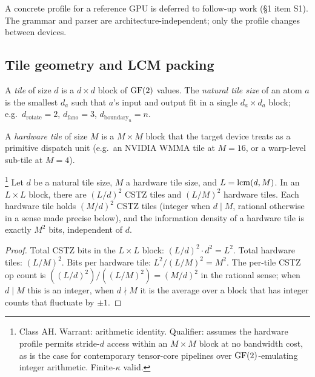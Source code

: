 A concrete profile for a reference GPU is deferred to
follow-up work (\S1 item S1). The grammar and parser
are architecture-independent; only the profile changes
between devices.

\subsection{Tile geometry and LCM packing}

\begin{definition}[Tile]\label{def:tile}
  A \emph{tile} of size $d$ is a $d \times d$ block of
  $\operatorname{GF}(2)$ values. The \emph{natural tile size} of an
  atom $a$ is the smallest $d_a$ such that $a$'s input
  and output fit in a single $d_a \times d_a$ block;
  e.g.\ $d_{\mathrm{rotate}} = 2$,
  $d_{\mathrm{fano}} = 3$,
  $d_{\mathrm{boundary}_n} = n$.
\end{definition}

\begin{definition}\label{def:hw-tile}
  A \emph{hardware tile} of size $M$ is a
  $M \times M$ block that the target device treats as
  a primitive dispatch unit (e.g.\ an NVIDIA WMMA tile
  at $M = 16$, or a warp-level sub-tile at $M = 4$).
\end{definition}

\begin{proposition}
  \label{prop:lcm-density}
  \footnote{Class \textsf{AH}. Warrant: arithmetic
  identity. Qualifier: assumes the hardware profile
  permits stride-$d$ access within an $M \times M$
  block at no bandwidth cost, as is the case for
  contemporary tensor-core pipelines over $\operatorname{GF}(2)$-emulating
  integer arithmetic. Finite-$\kappa$ valid.}
  Let $d$ be a natural tile size, $M$ a hardware tile
  size, and $L = \operatorname{lcm}(d, M)$. In an $L \times L$
  block, there are $(L/d)^2$ CSTZ tiles and $(L/M)^2$
  hardware tiles. Each hardware tile holds $(M/d)^2$
  CSTZ tiles (integer when $d \mid M$, rational
  otherwise in a sense made precise below), and the
  information density of a hardware tile is
  exactly $M^2$ bits, independent of $d$.
\end{proposition}

\begin{proof}
  Total CSTZ bits in the $L \times L$ block:
  $(L/d)^2 \cdot d^2 = L^2$. Total hardware tiles:
  $(L/M)^2$. Bits per hardware tile: $L^2 / (L/M)^2
  = M^2$. The per-tile CSTZ op count is
  $((L/d)^2) / ((L/M)^2) = (M/d)^2$ in the rational
  sense; when $d \mid M$ this is an integer, when
  $d \nmid M$ it is the average over a block that has
  integer counts that fluctuate by $\pm 1$.
\end{proof}

